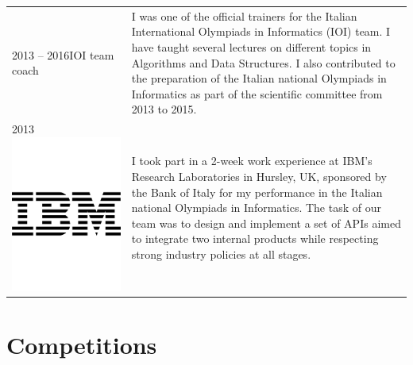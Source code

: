 \documentclass[10PT,letter]{article}
\newcommand{\numbox}[1]{} %
\begin{document}
\begin{tabular}{p{1in}p{5.55in}}
                \textsc{2013 -- 2016}\vspace{1mm}\newline IOI team coach &
                I was one of the official trainers for the Italian International Olympiads in Informatics (IOI) team. I have taught several lectures on different topics in Algorithms and Data Structures.
                I also contributed to the preparation of the Italian national Olympiads in Informatics as part of the scientific committee from 2013 to 2015.\\[1mm]
            
                \textsc{2013}\vspace{1mm}\newline \includegraphics[width=.75cm]{static/logos/IBM_logo.pdf} &
                I took part in a 2-week work experience at IBM's Research Laboratories in Hursley, UK, sponsored by the Bank of Italy for my performance in the Italian national Olympiads in Informatics. The task of our team was to design and implement a set of APIs aimed to integrate two internal products while respecting strong industry policies at all stages.
            \end{tabular}
    
    \section*{\numbox{8}\bfseries\textcolor{titlecol}{\sffamily Competitions}}
        \vspace{5pt}
\end{document}
